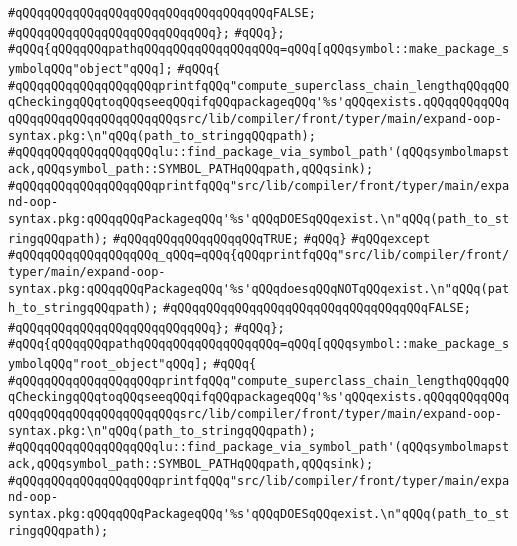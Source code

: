 \verb|#qQQqqQQqqQQqqQQqqQQqqQQqqQQqqQQqqQQqFALSE;|\newline
\verb|#qQQqqQQqqQQqqQQqqQQqqQQqqQQq};|\newline
\verb|#qQQq};|\newline
\verb|#qQQq{qQQqqQQqpathqQQqqQQqqQQqqQQqqQQq=qQQq[qQQqsymbol::make_package_symbolqQQq"object"qQQq];|\newline
\verb|#qQQq{|\newline
\verb|#qQQqqQQqqQQqqQQqqQQqprintfqQQq"compute_superclass_chain_lengthqQQqqQQqCheckingqQQqtoqQQqseeqQQqifqQQqpackageqQQq'%s'qQQqexists.qQQqqQQqqQQqqQQqqQQqqQQqqQQqqQQqqQQqsrc/lib/compiler/front/typer/main/expand-oop-syntax.pkg:\n"qQQq(path_to_stringqQQqpath);|\newline
\verb|#qQQqqQQqqQQqqQQqqQQqlu::find_package_via_symbol_path'(qQQqsymbolmapstack,qQQqsymbol_path::SYMBOL_PATHqQQqpath,qQQqsink);|\newline
\verb|#qQQqqQQqqQQqqQQqqQQqprintfqQQq"src/lib/compiler/front/typer/main/expand-oop-syntax.pkg:qQQqqQQqPackageqQQq'%s'qQQqDOESqQQqexist.\n"qQQq(path_to_stringqQQqpath);|\newline
\verb|#qQQqqQQqqQQqqQQqqQQqTRUE;|\newline
\verb|#qQQq}|\newline
\verb|#qQQqexcept|\newline
\verb|#qQQqqQQqqQQqqQQqqQQq_qQQq=qQQq{qQQqprintfqQQq"src/lib/compiler/front/typer/main/expand-oop-syntax.pkg:qQQqqQQqPackageqQQq'%s'qQQqdoesqQQqNOTqQQqexist.\n"qQQq(path_to_stringqQQqpath);|\newline
\verb|#qQQqqQQqqQQqqQQqqQQqqQQqqQQqqQQqqQQqFALSE;|\newline
\verb|#qQQqqQQqqQQqqQQqqQQqqQQqqQQq};|\newline
\verb|#qQQq};|\newline
\verb|#qQQq{qQQqqQQqpathqQQqqQQqqQQqqQQqqQQq=qQQq[qQQqsymbol::make_package_symbolqQQq"root_object"qQQq];|\newline
\verb|#qQQq{|\newline
\verb|#qQQqqQQqqQQqqQQqqQQqprintfqQQq"compute_superclass_chain_lengthqQQqqQQqCheckingqQQqtoqQQqseeqQQqifqQQqpackageqQQq'%s'qQQqexists.qQQqqQQqqQQqqQQqqQQqqQQqqQQqqQQqqQQqsrc/lib/compiler/front/typer/main/expand-oop-syntax.pkg:\n"qQQq(path_to_stringqQQqpath);|\newline
\verb|#qQQqqQQqqQQqqQQqqQQqlu::find_package_via_symbol_path'(qQQqsymbolmapstack,qQQqsymbol_path::SYMBOL_PATHqQQqpath,qQQqsink);|\newline
\verb|#qQQqqQQqqQQqqQQqqQQqprintfqQQq"src/lib/compiler/front/typer/main/expand-oop-syntax.pkg:qQQqqQQqPackageqQQq'%s'qQQqDOESqQQqexist.\n"qQQq(path_to_stringqQQqpath);|\newline
